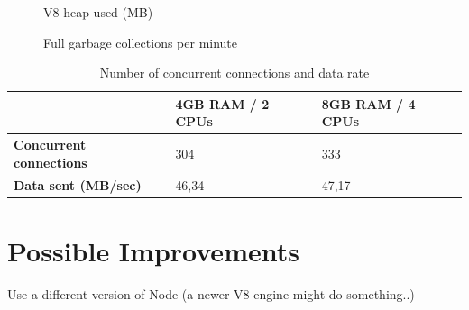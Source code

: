 \begin{figure}[h!]
	\centering
	 \hfill
	\caption{V8 heap used (MB)}
\end{figure}

\begin{figure}[h!]
	\centering
	 \hfill
	\caption{Full garbage collections per minute}
\end{figure}

\begin{table}[h!]
\begin{tabular}{lll}
\hline
	& \textbf{4GB RAM / 2 CPUs}	&	\textbf{8GB RAM / 4 CPUs} \\ \hline
\textbf{Concurrent connections}	& 304	& 333 \\
\textbf{Data sent (MB/sec)}	& 46,34	& 47,17 \\
\hline                         
\end{tabular}
\caption{Number of concurrent connections and data rate}
\label{table:connectionsDatarate}
\end{table}

\section{Possible Improvements}

Use a different version of Node (a newer V8 engine might do something..)


